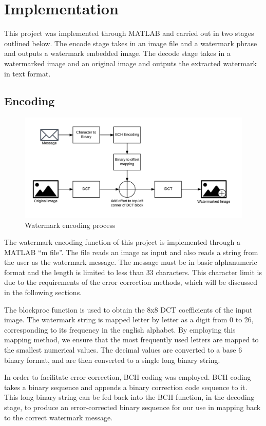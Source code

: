 \section{Implementation}\label{sec:impl}
This project was implemented through MATLAB and carried out in two stages outlined below.
The encode stage takes in an image file and a watermark phrase and outputs a watermark embedded image.
The decode stage takes in a watermarked image and an original image and outputs the extracted watermark in text format.

\subsection{Encoding}
\begin{figure}[tbph]
  \centering
  \includegraphics[width=0.75\linewidth]{graphics/encode}
  \caption{Watermark encoding process}
  \label{fig:encode}
\end{figure}

The watermark encoding function of this project is implemented through a MATLAB “m file”.
The file reads an image as input and also reads a string from the user as the watermark message.
The message must be in basic alphanumeric format and the length is limited to less than 33 characters.
This character limit is due to the requirements of the error correction methods, which will be discussed in the following sections.

The blockproc function is used to obtain the 8x8 DCT coefficients of the input image.
The watermark string is mapped letter by letter as a digit from 0 to 26, corresponding to its frequency in the english alphabet.
By employing this mapping method, we ensure that the most frequently used letters are mapped to the smallest numerical values.
The decimal values are converted to a base 6 binary format, and are then converted to a single long binary string.

In order to facilitate error correction, BCH coding was employed.
BCH coding takes a binary sequence and appends a binary correction code sequence to it.
This long binary string can be fed back into the BCH function, in the decoding stage, to produce an error-corrected binary sequence for our use in mapping back to the correct watermark message.

